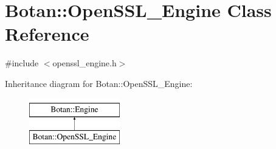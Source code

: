 \hypertarget{classBotan_1_1OpenSSL__Engine}{\section{Botan\-:\-:Open\-S\-S\-L\-\_\-\-Engine Class Reference}
\label{classBotan_1_1OpenSSL__Engine}
}


{\ttfamily \#include $<$openssl\-\_\-engine.\-h$>$}

Inheritance diagram for Botan\-:\-:Open\-S\-S\-L\-\_\-\-Engine\-:\begin{figure}[H]
\begin{center}
\leavevmode
\includegraphics[height=2.000000cm]{classBotan_1_1OpenSSL__Engine}
\end{center}
\end{figure}
